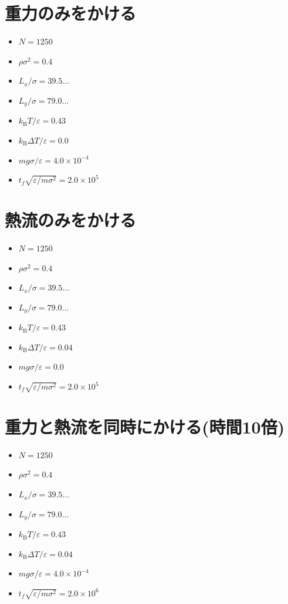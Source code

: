 



\section{重力のみをかける}

\begin{itemize}
  \item $N = 1250$
  \item $\rho {\sigma}^2 = 0.4$
  \item $L_x / \sigma = 39.5\dots$
  \item $L_y / \sigma = 79.0\dots$
  \item $k_{\text{B}} T / \varepsilon = 0.43$
  \item $k_{\text{B}} \Delta T / \varepsilon = 0.0$
  \item $mg\sigma/\varepsilon = 4.0 \times 10^{-4}$
  \item $t_f \sqrt{\varepsilon / m \sigma^2} = 2.0 \times 10^{5}$
\end{itemize}



\section{熱流のみをかける}

\begin{itemize}
  \item $N = 1250$
  \item $\rho {\sigma}^2 = 0.4$
  \item $L_x / \sigma = 39.5\dots$
  \item $L_y / \sigma = 79.0\dots$
  \item $k_{\text{B}} T / \varepsilon = 0.43$
  \item $k_{\text{B}} \Delta T / \varepsilon = 0.04$
  \item $mg\sigma/\varepsilon = 0.0$
  \item $t_f \sqrt{\varepsilon / m \sigma^2} = 2.0 \times 10^{5}$
\end{itemize}



\section{重力と熱流を同時にかける(時間10倍)}

\begin{itemize}
  \item $N = 1250$
  \item $\rho {\sigma}^2 = 0.4$
  \item $L_x / \sigma = 39.5\dots$
  \item $L_y / \sigma = 79.0\dots$
  \item $k_{\text{B}} T / \varepsilon = 0.43$
  \item $k_{\text{B}} \Delta T / \varepsilon = 0.04$
  \item $mg\sigma/\varepsilon = 4.0 \times 10^{-4}$
  \item $t_f \sqrt{\varepsilon / m \sigma^2} = 2.0 \times 10^{6}$
\end{itemize}

